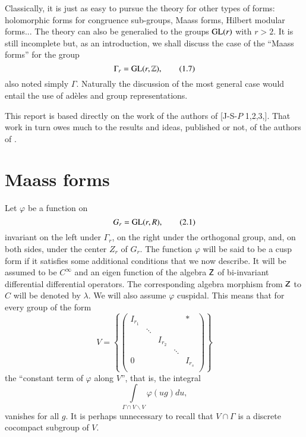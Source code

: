 Classically, it is just as easy to pursue the theory for other types of forms: holomorphic forms for congruence sub-groups, Maass forms, Hilbert modular forms... The theory can also be generalied to the groups $\mathrm{GL}(r)$ with $r>2$. It is still incomplete but, as an introduction, we shall discuss the case of the ``Maass forms'' for the group
\begin{equation*}
\Gamma_{r}=\mathrm{GL}(r,\mathbb{Z}),\tag{1.7}\label{art5-eq1.7}
\end{equation*}
also noted simply $\Gamma$. Naturally the discussion of the most general case would entail the use of ad\`eles and group representations.

This report is based directly on the work of the authors of [J-S-$P$ 1,2,3,]. That work in turn owes much to the results and ideas, published or not, of the authors of \cite{art5-G-K}.

\section{Maass forms}\label{art5-sec2}

Let $\varphi$ be a function on
\begin{equation*}
G_{r}=\mathrm{GL}(r,R),\tag{2.1}\label{art5-eq2.1}
\end{equation*}
invariant on the left under $\Gamma_{r}$, on the right under the orthogonal group, and, on both sides, under the center $Z_{r}$ of $G_{r}$. The function $\varphi$ will be said to be a cusp form if it satisfies some additional conditions that we now describe. It will be assumed to be $C^{\infty}$ and an eigen function of the algebra $\mathsf{Z}$ of bi-invariant differential differential operators. The corresponding algebra morphism from $\mathsf{Z}$ to $C$ will be denoted by $\lambda$. We will also assume $\varphi$ cuspidal. This means that for every group of the form
\begin{equation*}
V=
\left\{
\left(
\begin{matrix}
I_{r_{1}} & & & & \ast \\
  & \ddots & & & \\
  &  & I_{r_{2}} & & \\
  &  & & \ddots &\\
0  & & & & I_{r_{s}}\\
\end{matrix}
\right)
\right\}\tag{2.2}\label{art5-eq2.2}
\end{equation*}
the ``constant term of $\varphi$ along $V$'', that is, the integral
\begin{equation*}
\int\limits_{\Gamma\cap V\backslash V}\varphi(ug)du,\tag{2.3}\label{art5-eq2.3}
\end{equation*}
vanishes for all $g$. It is perhaps unnecessary to recall that $V\cap \Gamma$ is a discrete cocompact subgroup of $V$.

